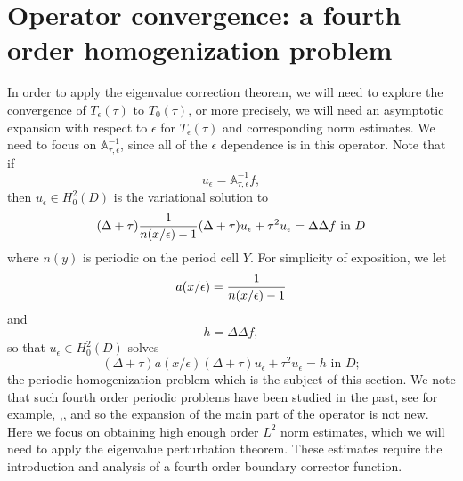 \documentclass[10pt,a4paper]{amsart}
\begin{document}
\section{Operator convergence: a fourth order homogenization problem}\label{sec3}
In order to apply the eigenvalue correction theorem, we will need to explore the convergence of $T_\epsilon(\tau)$ to $T_0(\tau)$, or more precisely, we will need an asymptotic expansion  with respect to $\epsilon$ for $T_\epsilon(\tau)$ and corresponding norm estimates. We need to focus on $ \mathbb{A}_{\tau,\epsilon}^{-1}$, since all of the $\epsilon$ dependence is in this operator. Note that if $$u_\epsilon = \mathbb{A}_{\tau,\epsilon}^{-1} f, $$
then  $u_\epsilon\in H^2_0(D)$ is  the variational solution to  
\begin{equation} \label{eq:uepsn} (\Delta +\tau ) {1\over{n(x/\epsilon) -1}}(\Delta +\tau )u_\epsilon +\tau^2 u_\epsilon = \Delta\Delta f \mbox{ in } D \end{equation}
where $n(y)$ is periodic on the period cell $Y$.  For simplicity of exposition, we let 
\begin{equation} \label{eq:a} a(x/\epsilon) = {1\over{n(x/\epsilon) -1}}  \end{equation}
and $$h= \Delta \Delta f ,$$
so that $u_\epsilon\in H^2_0(D)$ solves 
\begin{equation} \label{eq:uepsa} (\Delta +\tau ) a(x/\epsilon) (\Delta +\tau )u_\epsilon +\tau^2 u_\epsilon = h\mbox{ in } D ;\end{equation}
 the periodic homogenization problem which is the subject of this section.  We note that such fourth order periodic problems have been studied in the past, see for example, \cite{Pa},\cite{Fr},   and so the expansion of the main part of the operator is not new. Here we focus on obtaining high enough order $L^2$ norm estimates, which we will need to apply the eigenvalue perturbation theorem. These estimates require the introduction and analysis of a fourth order boundary corrector function. 
\end{document}
